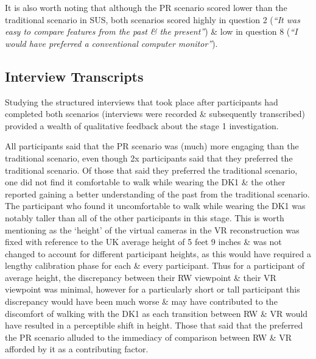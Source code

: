 It is also worth noting that although the PR scenario scored lower than the traditional scenario in SUS, both scenarios scored highly in question 2 (\textit{``It was easy to compare features from the past \& the present''}) \& low in question 8 (\textit{``I would have preferred a conventional computer monitor''}).


\subsection{Interview Transcripts}

Studying the structured interviews that took place after participants had completed both scenarios (interviews were recorded \& subsequently transcribed) provided a wealth of qualitative feedback about the stage 1 investigation.

All participants said that the PR scenario was (much) more engaging than the traditional scenario, even though 2x participants said that they preferred the traditional scenario. Of those that said they preferred the traditional scenario, one did not find it comfortable to walk while wearing the DK1 \& the other reported gaining a better understanding of the past from the traditional scenario. The participant who found it uncomfortable to walk while wearing the DK1 was notably taller than all of the other participants in this stage. This is worth mentioning as the `height' of the virtual cameras in the VR reconstruction was fixed with reference to the UK average height of 5 feet 9 inches \& was not changed to account for different participant heights, as this would have required a lengthy calibration phase for each \& every participant. Thus for a participant of average height, the discrepancy between their RW viewpoint \& their VR viewpoint was minimal, however for a particularly short or tall participant this discrepancy would have been much worse \& may have contributed to the discomfort of walking with the DK1 as each transition between RW \& VR would have resulted in a perceptible shift in height. Those that said that the preferred the PR scenario alluded to the immediacy of comparison between RW \& VR afforded by it as a contributing factor.

